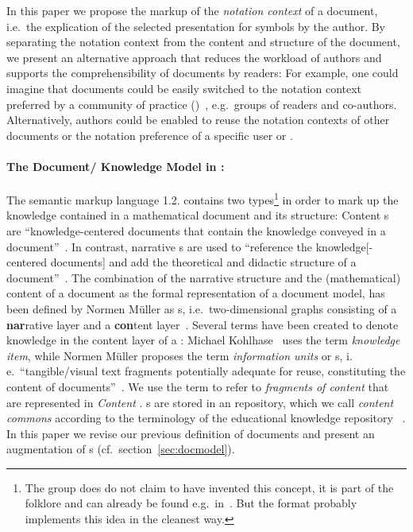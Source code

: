 \documentclass[a4paper]{article}
\begin{document}
In this paper we propose the markup of the {\emph{notation context}} of a document, i.e.\
the explication of the selected presentation for symbols by the author. By separating the
notation context from the content and structure of the document, we present an alternative
approach that reduces the workload of authors and supports the comprehensibility of
documents by readers: For example, one could imagine that documents could be easily
switched to the notation context preferred by a community of practice
({\cop})~\cite{Wen05}, e.g.\ groups of readers and co-authors. Alternatively, authors
could be enabled to reuse the notation contexts of other documents or the notation
preference of a specific user or
{\cop}.%

\paragraph{The Document/ Knowledge Model in {\omdoc}:}
The semantic markup language {\omdoc}1.2. contains two {\omdoc} types\footnote{The
  {\omdoc} group does do not claim to have invented this concept, it is part of the {\xml}
  folklore and can already be found e.g.\ in~\cite{vd04:nc}. But the {\omdoc} format
  probably implements this idea in the cleanest way.} in order to mark up the knowledge
contained in a mathematical document and its structure: Content {\omdoc}s are
``knowledge-centered documents that contain the knowledge conveyed in a
document''~\cite{Kohlhase:omdoc1.2}. In contrast, narrative {\omdoc}s are used to
``reference the knowledge[-centered documents] and add the theoretical and didactic
structure of a document''~\cite{Kohlhase:omdoc1.2}. The combination of the narrative
structure and the (mathematical) content of a document as the formal representation of a
document model, has been defined by Normen M\"uller as {\narcon}s, i.e.\ two-dimensional
graphs consisting of a \textbf{nar}rative layer and a \textbf{con}tent
layer~\cite{NRM:lwa06}. Several terms have been created to denote knowledge in the content
layer of a {\narcon}: Michael Kohlhase~\cite{Kohlhase:omdoc1.2} uses the term
\textit{knowledge item}, while Normen M\"uller proposes the term {\emph{information
    units}} or {\infom}s, i.\,e.\ ``tangible/visual text fragments potentially adequate
for reuse, constituting the content of documents''~\cite{NRM:lwa06}. We use the term
{\infom} to refer to {\emph{fragments of content}} that are represented in
{\emph{Content}} {\omdoc}.  {\infom}s are stored in an {\omdoc} repository, which we call
{\emph{content commons}} according to the terminology of the educational knowledge
repository {\connexions}~\cite{cnxweb}. In this paper we revise our previous definition of
documents and present an augmentation of {\narcon}s (cf.~section~\ref{sec:docmodel}).
\end{document}
